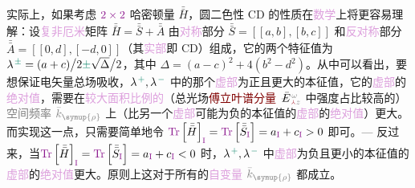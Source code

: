 实际上，如果考虑 $\textcolor{Plum}{2 \times 2}$ \textcolor{NavyBlue}{哈密顿量} $\bar{\bar{H}}$，\textcolor{NavyBlue}{圆二色性 CD} 的性质在\textcolor{Plum}{数学}上将更容易理解：设\textcolor{Plum}{复非厄米}矩阵 $\bar{\bar{H}} = \bar{\bar{S}} + \bar{\bar{A}}$ 由\textcolor{Plum}{对称}部分 $\bar{\bar{S}} = \left[ \left[ a,b \right],\left[ b,c \right] \right]$ 和\textcolor{Plum}{反对称}部分 $\bar{\bar{A}} = \left[ \left[ 0,d \right],\left[ -d,0 \right] \right]$（其\textcolor{Plum}{实部}即 \textcolor{NavyBlue}{CD}）组成，它的两个\textcolor{PineGreen}{特征值}为 $\lambda^{\;\!\textcolor{PineGreen}{\pm}} = (a+c) \big/ 2 \textcolor{PineGreen}{\pm} \sqrt{\Delta} \big/ 2$，其中 $\Delta = \left( a-c \right)^2 + 4 \left( b^2 - d^2 \right)$。从中可以看出，要想保证\textcolor{PineGreen}{电矢量总场}\textcolor{NavyBlue}{吸收}，$\lambda^{\;\!\textcolor{PineGreen}{+}}, \lambda^{\;\!\textcolor{PineGreen}{-}}$ 中的那个\textcolor{Plum}{虚部}为正且更大的\textcolor{PineGreen}{本征值}，它的\textcolor{Plum}{虚部}的\textcolor{Plum}{绝对值}，需要在\textcolor{Plum}{较大面积比例的}（\textcolor{PineGreen}{总光场}\textcolor{Maroon}{傅立叶谱分量} $\Xint{\mathcolor{gray}{-}}{25}{\bar{E}}^{\;\!\mathcolor{gray}{\omega}}_{\;\! \textcolor{Maroon}{\Yup} \mathcolor{gray}{z}}$ 中\textcolor{NavyBlue}{强度}占比较高的）\textcolor{gray}{空间频率} $\mathcolor{gray}{\bar{k}_{\symup{\rho}}}$ 上（比另一个\textcolor{Plum}{虚部}可能为负的\textcolor{PineGreen}{本征值}的\textcolor{Plum}{虚部}的\textcolor{Plum}{绝对值}）更大。而实现这一点，只需要简单地令 $\textcolor{Plum}{\text{Tr}} \left[ \bar{\bar{H}} \right]_{\textcolor{Plum}{\text{I}}} = \textcolor{Plum}{\text{Tr}} \left[ \bar{\bar{S}}_{\textcolor{Plum}{\text{I}}} \right] = a_{\textcolor{Plum}{\text{I}}} + c_{\textcolor{Plum}{\text{I}}} > 0$ 即可\cite{berryOpticalSingularitiesBirefringent2003}。--- 反过来，当$\textcolor{Plum}{\text{Tr}} \left[ \bar{\bar{H}} \right]_{\textcolor{Plum}{\text{I}}} = \textcolor{Plum}{\text{Tr}} \left[ \bar{\bar{S}}_{\textcolor{Plum}{\text{I}}} \right] = a_{\textcolor{Plum}{\text{I}}} + c_{\textcolor{Plum}{\text{I}}} < 0$ 时，$\lambda^{\;\!\textcolor{PineGreen}{+}}, \lambda^{\;\!\textcolor{PineGreen}{-}}$ 中\textcolor{Plum}{虚部}为负且更小的\textcolor{PineGreen}{本征值}的\textcolor{Plum}{虚部}的\textcolor{Plum}{绝对值}更大。原则上这对于所有的\textcolor{Plum}{自变量} $\mathcolor{gray}{\bar{k}_{\symup{\rho}}}$ 都成立。


